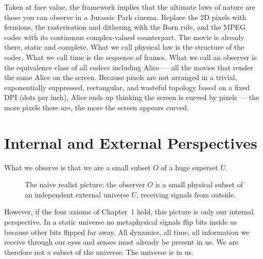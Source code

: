 Taken at face value, the framework implies that the ultimate laws of
nature are those you can observe in a Jurassic Park cinema. Replace the
2D pixels with fermions, the rasterisation and dithering with the Born
rule, and the MPEG codec with its continuous complex-valued counterpart.
The movie is already there, static and complete. What we call physical
law is the structure of the codec. What we call time is the sequence of
frames. What we call an observer is the equivalence class of all
codecs including Alice --- all the movies that render the same Alice on the
screen. Because pixels are not arranged in a trivial, exponentially 
suppressed, rectangular, and wasteful topology based on a fixed DPI 
(dots per inch), Alice ends up thinking the screen is curved by pixels --- 
the more pixels there are, the more the screen appears curved.


\section{Internal and External Perspectives}

What we observe is that we are a small subset $O$ of a huge superset $U$.

\begin{figure}[htbp]
\centering
{}
\caption{The naive realist picture: the observer $O$ is a small physical
subset of an independent external universe $U$, receiving signals from
outside.}
\label{fig:diag1}
\end{figure}

However, if the four axioms of Chapter~1 hold, this picture is only our
internal perspective. In a static universe no metaphysical signals flip
bits inside us because other bits flipped far away. All dynamics, all
time, all information we receive through our eyes and senses must already
be present in us. We are therefore not a subset of the universe. The
universe is in us.

